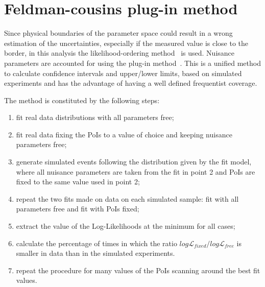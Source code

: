 \section{Feldman-cousins plug-in method}
\label{sec:FeldmanCousins}

Since physical boundaries of the parameter space could result in a wrong estimation of the uncertainties,
especially if the measured value is close to the border, in this analysis the likelihood-ordering
method~\cite{Feldman:1997qc} is used. Nuisance parameters are accounted for using the
plug-in method~\cite{woodroofe,Karbach:2011uz}. This is a unified method to calculate confidence
intervals and upper/lower limits, based on simulated experiments and has the advantage
of having a well defined frequentist coverage.


The method is constituted by the following steps:
\begin{enumerate}
\item fit real data distributions with all parameters free;
\item fit real data fixing the PoIs to a value of choice and keeping nuisance parameters free;
\item generate simulated events following the distribution given by the fit model,
where all nuisance parameters are taken from the fit in point 2 and PoIs are fixed to the same value used in point 2;
\item repeat the two fits made on data on each simulated sample: fit with all parameters free and fit with PoIs fixed;
\item extract the value of the Log-Likelihoods at the minimum for all cases;
\item calculate the percentage of times in which the ratio
$log\mathcal{L}_{fixed}/log\mathcal{L}_{free}$ is smaller in data than in the simulated experiments.
\item repeat the procedure for many values of the PoIs scanning around the best fit values.
\end{enumerate}

